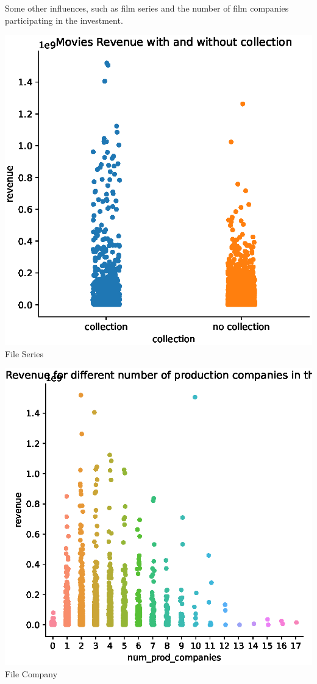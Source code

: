 Some other influences, such as film series and the number of film companies participating in the investment.
\begin{center}
  \begin{minipage}{0.3\linewidth}
  \centering
    \includegraphics[width=0.8\linewidth]{figures//collection.eps}\\
  {\small{File Series}}
  \end{minipage}
  \hfill
  \begin{minipage}{0.3\linewidth}
  \centering
    \includegraphics[width=0.8\linewidth]{figures//company.eps}\\
  {\small{File Company}}
  \end{minipage}
\end{center}

